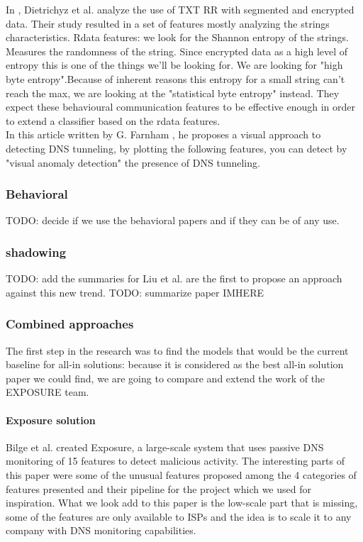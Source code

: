In \cite{tunn1}, Dietrichyz et al. analyze the use of TXT RR with segmented and encrypted data. Their study resulted in a set of features mostly analyzing the strings characteristics.
Rdata features: we look for the Shannon entropy of the strings. Measures the randomness of the string. Since encrypted data as a high level of entropy this is one of the things we'll be looking for. We are looking for "high byte entropy".Because of inherent reasons this entropy for a small string can't reach the max, we are looking at the "statistical byte entropy" instead.
They expect these behavioural communication features to be effective enough in order to extend a classifier based on the rdata features.\\

In this article written by G. Farnham \cite{tunn}, he proposes a visual approach to detecting DNS tunneling, by plotting the following features, you can detect by "visual anomaly detection" the presence of DNS tunneling. 

\cite{dns-tun}


\subsubsection{Behavioral}
TODO: decide if we use the behavioral papers and if they can be of any use.


\subsubsection{shadowing}
TODO: add the summaries for 
Liu et al. \cite{shadowing} are the first to propose an approach against this new trend. TODO: summarize paper 
IMHERE

\subsubsection{Combined approaches}
The first step in the research was to find the models that would be the current baseline for all-in solutions: because it is considered as the best all-in solution paper we could find, we are going to compare and extend the work of the EXPOSURE team.

\paragraph{Exposure solution}
Bilge et al. \cite{exposure} created Exposure, a large-scale system that uses passive DNS monitoring of 15 features to detect malicious activity. The interesting parts of this paper were some of the unusual features proposed among the 4 categories of features presented and their pipeline for the project which we used for inspiration. What we look add to this paper is the low-scale part that is missing, some of the features are only available to ISPs and the idea is to scale it to any company with DNS monitoring capabilities.

